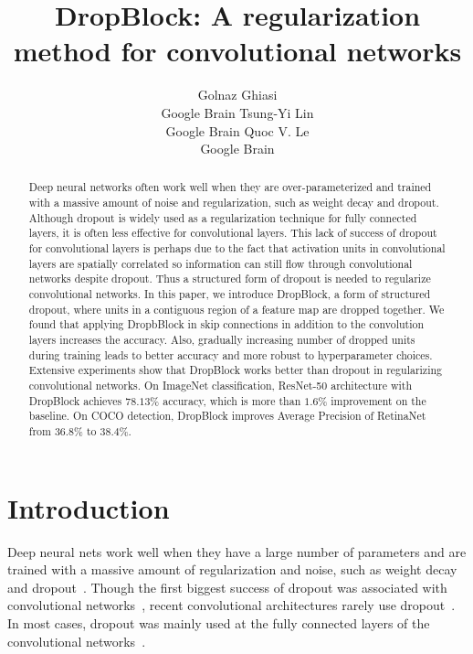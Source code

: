 \documentclass{article}
\title{DropBlock: A regularization method for convolutional networks}
\author{
  Golnaz Ghiasi \\ Google Brain
  \And
  Tsung-Yi Lin \\ Google Brain
  \And
  Quoc V. Le \\ Google Brain
}
\begin{document}
\maketitle

\begin{abstract}
  Deep neural networks often work well when they are over-parameterized and trained with a massive amount of noise and regularization, such as weight decay and dropout. Although dropout is widely used as a regularization technique for fully connected layers, it is often less effective for convolutional layers. This lack of success of dropout for convolutional layers is perhaps due to the fact that activation units in  convolutional layers are spatially correlated so information can still flow through convolutional networks despite dropout. Thus a structured form of dropout is needed to regularize convolutional networks. In this paper, we introduce DropBlock, a form of structured dropout, where units in a contiguous region of a feature map are dropped together. We found that applying DropbBlock in skip connections in addition to the convolution layers increases the accuracy. Also, gradually increasing number of dropped units during training leads to better accuracy and more robust to hyperparameter choices. Extensive experiments show that DropBlock works better than dropout in regularizing convolutional networks.
  On ImageNet classification, ResNet-50 architecture with DropBlock achieves $78.13\%$ accuracy, which is more than $1.6\%$ improvement on the baseline. On COCO detection, DropBlock improves Average Precision of RetinaNet from $36.8\%$ to $38.4\%$.
\end{abstract}


\section{Introduction}
Deep neural nets work well when they have a large number of parameters and are trained with a massive amount of regularization and noise, such as weight decay and dropout~\cite{dropout2014}. Though the first biggest success of dropout was associated with convolutional networks~\cite{krizhevsky2012imagenet}, recent convolutional architectures rarely use dropout~\cite{ioffe2015batch,he2016deep,szegedy2017inception,xie2017aggregated,han2017deep,zoph2017learning,hu2017squeeze,real2018regularized}. In most cases, dropout was mainly used at the fully connected layers of the convolutional networks~\cite{simonyan2014very,szegedy2015going,szegedy2016rethinking}.
\end{document}
